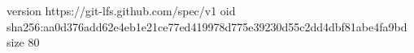 version https://git-lfs.github.com/spec/v1
oid sha256:aa0d376add62e4eb1e21ce77ed419978d775e39230d55c2dd4dbf81abe4fa9bd
size 80
